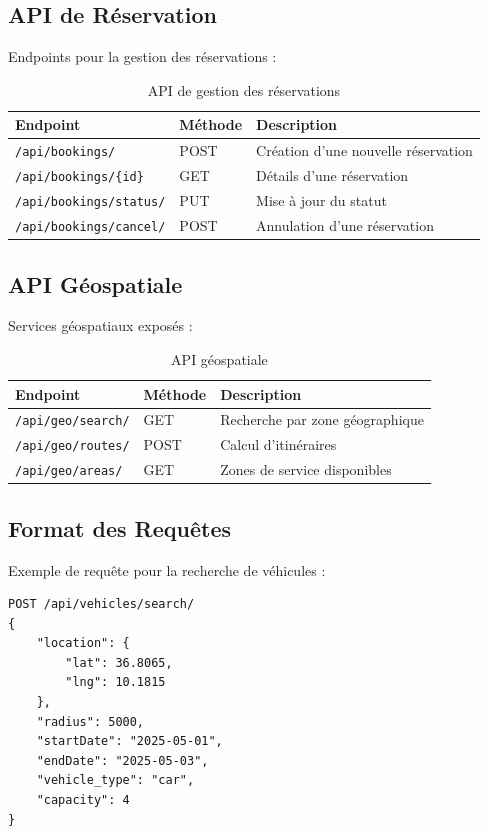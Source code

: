 \subsection{API de Réservation}
Endpoints pour la gestion des réservations :

\begin{table}[h]
\centering
\begin{tabular}{|p{3cm}|p{2cm}|p{8cm}|}
\hline
\textbf{Endpoint} & \textbf{Méthode} & \textbf{Description} \\
\hline
\texttt{/api/bookings/} & POST & Création d'une nouvelle réservation \\
\hline
\texttt{/api/bookings/\{id\}} & GET & Détails d'une réservation \\
\hline
\texttt{/api/bookings/status/} & PUT & Mise à jour du statut \\
\hline
\texttt{/api/bookings/cancel/} & POST & Annulation d'une réservation \\
\hline
\end{tabular}
\caption{API de gestion des réservations}
\label{tab:booking_api}
\end{table}

\subsection{API Géospatiale}
Services géospatiaux exposés :

\begin{table}[h]
\centering
\begin{tabular}{|p{3cm}|p{2cm}|p{8cm}|}
\hline
\textbf{Endpoint} & \textbf{Méthode} & \textbf{Description} \\
\hline
\texttt{/api/geo/search/} & GET & Recherche par zone géographique \\
\hline
\texttt{/api/geo/routes/} & POST & Calcul d'itinéraires \\
\hline
\texttt{/api/geo/areas/} & GET & Zones de service disponibles \\
\hline
\end{tabular}
\caption{API géospatiale}
\label{tab:geo_api}
\end{table}

\subsection{Format des Requêtes}
Exemple de requête pour la recherche de véhicules :

\begin{verbatim}
POST /api/vehicles/search/
{
    "location": {
        "lat": 36.8065,
        "lng": 10.1815
    },
    "radius": 5000,
    "startDate": "2025-05-01",
    "endDate": "2025-05-03",
    "vehicle_type": "car",
    "capacity": 4
}
\end{verbatim}

